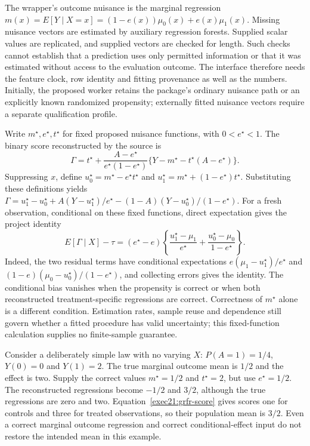 The wrapper's outcome nuisance is the marginal regression $m(x)=E[Y\mid X=x]=(1-e(x))\mu_0(x)+e(x)\mu_1(x)$. Missing nuisance vectors are estimated by auxiliary regression forests. Supplied scalar values are replicated, and supplied vectors are checked for length. Such checks cannot establish that a prediction uses only permitted information or that it was estimated without access to the evaluation outcome. The interface therefore needs the feature clock, row identity and fitting provenance as well as the numbers. Initially, the proposed worker retains the package's ordinary nuisance path or an explicitly known randomized propensity; externally fitted nuisance vectors require a separate qualification profile.~\citep{exec21_grf_reuse}

Write $m^\star,e^\star,t^\star$ for fixed proposed nuisance functions, with $0<e^\star<1$. The binary score reconstructed by the source is
\begin{equation}
 \Gamma=t^\star+\frac{A-e^\star}{e^\star(1-e^\star)}
       \{Y-m^\star-t^\star(A-e^\star)\}.
 \label{exec21:grfr-score}
\end{equation}
Suppressing $x$, define $u_0^\star=m^\star-e^\star t^\star$ and
$u_1^\star=m^\star+(1-e^\star)t^\star$. Substituting these definitions yields
$\Gamma=u_1^\star-u_0^\star+A(Y-u_1^\star)/e^\star
-(1-A)(Y-u_0^\star)/(1-e^\star)$. For a fresh observation, conditional on these fixed functions, direct expectation gives the project identity
\begin{equation}
 E[\Gamma\mid X]-\tau
 =(e^\star-e)\left\{\frac{u_1^\star-\mu_1}{e^\star}
                   +\frac{u_0^\star-\mu_0}{1-e^\star}\right\}.
 \label{exec21:grfr-bias}
\end{equation}
Indeed, the two residual terms have conditional expectations
$e(\mu_1-u_1^\star)/e^\star$ and
$(1-e)(\mu_0-u_0^\star)/(1-e^\star)$, and collecting errors gives the identity. The conditional bias vanishes when the propensity is correct or when both reconstructed treatment-specific regressions are correct. Correctness of $m^\star$ alone is a different condition. Estimation rates, sample reuse and dependence still govern whether a fitted procedure has valid uncertainty; this fixed-function calculation supplies no finite-sample guarantee.~\citep{exec21_grf_reuse,exec21_grf_reference}

Consider a deliberately simple law with no varying $X$: $P(A=1)=1/4$, $Y(0)=0$ and $Y(1)=2$. The true marginal outcome mean is $1/2$ and the effect is two. Supply the correct values $m^\star=1/2$ and $t^\star=2$, but use $e^\star=1/2$. The reconstructed regressions become $-1/2$ and $3/2$, although the true regressions are zero and two. Equation~\eqref{exec21:grfr-score} gives scores one for controls and three for treated observations, so their population mean is $3/2$. Even a correct marginal outcome regression and correct conditional-effect input do not restore the intended mean in this example.

